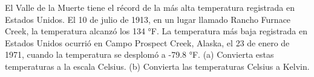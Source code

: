 \item El Valle de la Muerte tiene el récord de la más alta temperatura registrada en Estados Unidos. El 10 de julio de 1913, en un lugar llamado Rancho Furnace Creek, la temperatura alcanzó los 134 °F. La temperatura más baja registrada en Estados Unidos ocurrió en Campo Prospect Creek, Alaska, el 23 de enero de 1971, cuando la temperatura se desplomó a -79.8 °F. (a) Convierta estas temperaturas a la escala Celsius. (b) Convierta las temperaturas Celsius a Kelvin.
